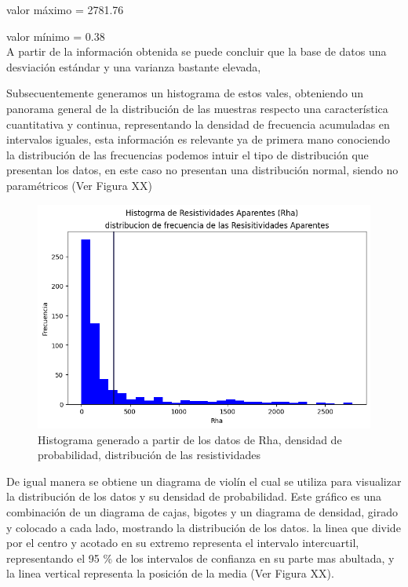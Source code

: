 \documentclass[sn-mathphys,Numbered]{sn-jnl}%
\theoremstyle{thmstyleone}%
\theoremstyle{thmstyletwo}%
\theoremstyle{thmstylethree}%
\begin{document}
valor máximo = 2781.76

valor mínimo = 0.38\\

A partir de la información obtenida se puede concluir que la base de datos una desviación estándar y una varianza bastante elevada,  

Subsecuentemente generamos un histograma de estos vales, obteniendo un panorama general de la distribución de las muestras respecto una característica cuantitativa y continua, representando la densidad de frecuencia acumuladas en intervalos iguales,\cite{Gutierrez2013} esta información es relevante ya de primera mano conociendo la distribución de las frecuencias podemos intuir el tipo de distribución que presentan los datos, en este caso no presentan una distribución normal, siendo no paramétricos (Ver Figura XX)

\begin{figure}[H]
	\centering
	\includegraphics[width=0.7\linewidth]{imagenes/Histograma_Rha}
	\caption[Figura]{Histograma generado a partir de los datos de Rha, densidad de probabilidad, distribución de las resistividades}
	\label{fig:histogramarha}
\end{figure}

De igual manera se obtiene un diagrama de violín el cual se utiliza para visualizar la distribución de los datos y su densidad de probabilidad. Este gráfico es una combinación de un diagrama de cajas, bigotes y un diagrama de densidad, girado y colocado a cada lado, mostrando la distribución de los datos. la linea que divide por el centro y acotado en su extremo representa el intervalo intercuartil, representando el 95 \% de los intervalos de confianza en su parte mas abultada, y la linea vertical representa la posición de la media (Ver Figura XX).
\end{document}
